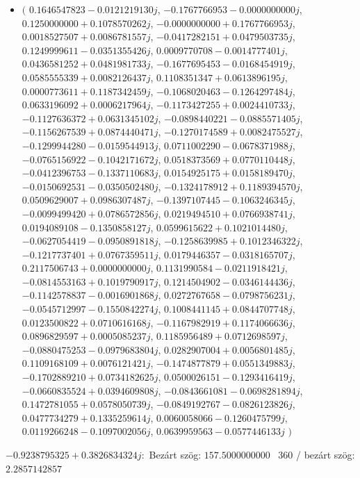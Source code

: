 \documentclass[14pt,a4paper]{article}
\begin{document}
\begin{itemize}
\item
$\big($
$0.1646547823-0.0121219130j$, $-0.1767766953-0.0000000000j$, $0.1250000000+0.1078570262j$, $-0.0000000000+0.1767766953j$, $0.0018527507+0.0086781557j$, $-0.0417282151+0.0479503735j$, $0.1249999611-0.0351355426j$, $0.0009770708-0.0014777401j$, $0.0436581252+0.0481981733j$, $-0.1677695453-0.0168454919j$, $0.0585555339+0.0082126437j$, $0.1108351347+0.0613896195j$, $0.0000773611+0.1187342459j$, $-0.1068020463-0.1264297484j$, $0.0633196092+0.0006217964j$, $-0.1173427255+0.0024410733j$, $-0.1127636372+0.0631345102j$, $-0.0898440221-0.0885571405j$, $-0.1156267539+0.0874440471j$, $-0.1270174589+0.0082475527j$, $-0.1299944280-0.0159544913j$, $0.0711002290-0.0678371988j$, $-0.0765156922-0.1042171672j$, $0.0518373569+0.0770110448j$, $-0.0412396753-0.1337110683j$, $0.0154925175+0.0158189470j$, $-0.0150692531-0.0350502480j$, $-0.1324178912+0.1189394570j$, $0.0509629007+0.0986307487j$, $-0.1397107445-0.1063246345j$, $-0.0099499420+0.0786572856j$, $0.0219494510+0.0766938741j$, $0.0194089108-0.1350858127j$, $0.0599615622+0.1021014480j$, $-0.0627054419-0.0950891818j$, $-0.1258639985+0.1012346322j$, $-0.1217737401+0.0767359511j$, $0.0179446357-0.0318165707j$, $0.2117506743+0.0000000000j$, $0.1131990584-0.0211918421j$, $-0.0814553163+0.1019790917j$, $0.1214504902-0.0346144436j$, $-0.1142578837-0.0016901868j$, $0.0272767658-0.0798756231j$, $-0.0545712997-0.1550842274j$, $0.1008441145+0.0844707748j$, $0.0123500822+0.0710616168j$, $-0.1167982919+0.1174066636j$, $0.0896829597+0.0005085237j$, $0.1185956489+0.0712698597j$, $-0.0880475253-0.0979683804j$, $0.0282907004+0.0056801485j$, $0.1109168109+0.0076121421j$, $-0.1474877879+0.0551349883j$, $-0.1702889210+0.0734182625j$, $0.0500026151-0.1293416419j$, $-0.0660835524+0.0394609808j$, $-0.0843661081-0.0698281894j$, $0.1472781055+0.0578050739j$, $-0.0849192767-0.0826123826j$, $0.0477734279+0.1335259614j$, $0.0060058066-0.1260475799j$, $0.0119266248-0.1097002056j$, $0.0639959563-0.0577446133j$
$\big)$
\end{itemize}
$-0.9238795325+0.3826834324j$:\
Bezárt szög: $157.5000000000$ \
360 / bezárt szög: $2.2857142857$\
\end{document}
